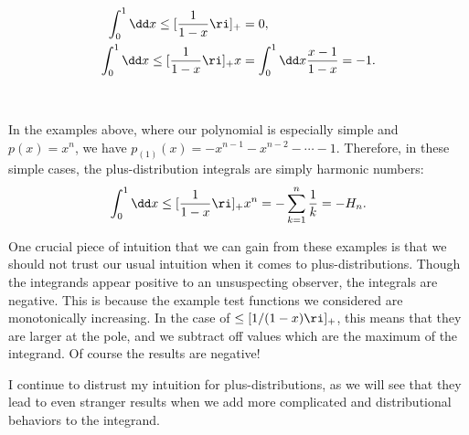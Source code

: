 \begin{align}
    \int_{0}^{1} \dd x \le[\frac{1}{1-x}\ri]_+
    &=
    0
    ,
    \\
    \int_{0}^{1} \dd x \le[\frac{1}{1-x}\ri]_+ x
    &=
    \int_{0}^{1} \dd x \frac{x - 1}{1-x} = -1
    .
\end{align}

~\\
\begin{example}{}
    In the examples above, where our polynomial is especially simple and \(p(x) = x^n\), we have \(p_{(1)}(x) = -x^{n-1} - x^{n-2} - \cdots - 1\).
    Therefore, in these simple cases, the plus-distribution integrals are simply harmonic numbers:
    \begin{align}
        \int_{0}^{1} \dd x \le[\frac{1}{1-x}\ri]_+ x^n
        =
        -\sum_{k=1}^n \frac{1}{k}
        =
        -H_n.
    \end{align}
\end{example}

One crucial piece of intuition that we can gain from these examples is that we should not trust our usual intuition when it comes to plus-distributions.
%
Though the integrands appear positive to an unsuspecting observer, the integrals are negative.
%
This is because the example test functions we considered are monotonically increasing.
%
In the case of \(\le[1/(1-x)\ri]_+\), this means that they are larger at the pole, and we subtract off values which are the maximum of the integrand.
%
Of course the results are negative!

I continue to distrust my intuition for plus-distributions, as we will see that they lead to even stranger results when we add more complicated and distributional behaviors to the integrand.


